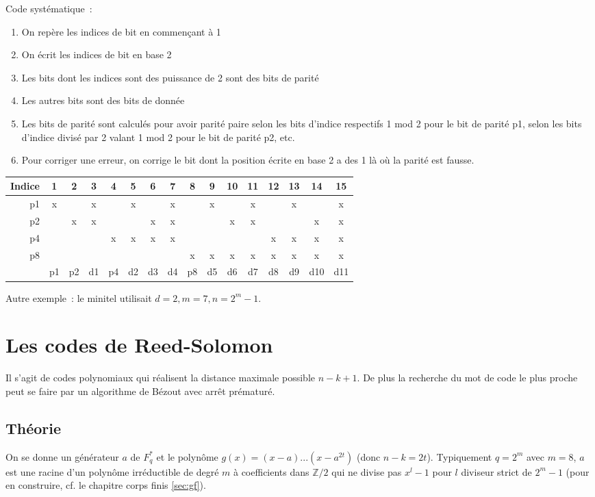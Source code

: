 \documentclass[a4paper,11pt]{book}
\begin{document}
\begin{giacjshere}
Code syst\'ematique~: 
\begin{enumerate}
\item On rep\`ere les indices de bit en commen\c{c}ant
\`a 1
\item On \'ecrit les indices de bit en base 2
\item Les bits dont les indices sont des puissance de 2
sont des bits de parit\'e
\item Les autres bits sont des bits de donn\'ee
\item Les bits de parit\'e sont calcul\'es pour avoir parit\'e
paire selon les bits d'indice respectifs 1 mod 2 pour le bit de
parit\'e p1, selon les bits d'indice divis\'e par 2 valant 1 mod 2 pour le bit de parit\'e p2, etc.
\item Pour corriger une erreur, on corrige le bit dont la position
\'ecrite en base 2 a des 1 l\`a o\`u la parit\'e est fausse.
\end{enumerate}
\begin{tabular}{|r|ccccccccccccccc|} \hline 
Indice & 1 & 2 & 3 & 4 & 5 & 6 & 7 & 8 & 9 & 10 & 11 & 12 & 13 & 14 & 15 \\ \hline
p1     &  x &   & x &   & x  &    & x  &   & x &     &  x   &    & x  &  & x \\
p2     &     & x & x & &     & x  & x &    &    & x  & x    &   &    & x & x \\
p4     &     &    &    & x & x& x& x&      &    &     &       & x& x& x& x \\
p8      &    &    &    &    &    &   &  & x   & x & x  & x   & x & x & x & x \\
\hline 
& p1 & p2 & d1 & p4 & d2 & d3 & d4 & p8 & d5 & d6 & d7 & d8 & d9 & d10 & d11 \\
\hline 
\end{tabular}

Autre exemple~: le minitel utilisait $d=2, m=7, n=2^m-1$.

\section{Les codes de Reed-Solomon}
Il s'agit de codes polynomiaux qui r\'ealisent la distance maximale
possible $n-k+1$. De plus la recherche du mot de code le plus
proche peut se faire par un algorithme de B\'ezout avec arr\^et 
pr\'ematur\'e.

\subsection{Théorie}
On se donne un g\'en\'erateur $a$ 
de $F_q^*$ et le polyn\^ome $g(x)=(x-a)...(x-a^{2t})$ (donc $n-k=2t$). 
Typiquement $q=2^m$ avec $m=8$, 
$a$ est une racine d'un polyn\^ome irr\'eductible
de degr\'e $m$ à coefficients dans $\mathbb{Z}/2$ 
qui ne divise pas $x^l-1$ pour $l$ diviseur
strict de $2^m-1$ (pour en construire,
cf. le chapitre corps finis \ref{sec:gf}).


\end{giacjshere}
\end{document}
